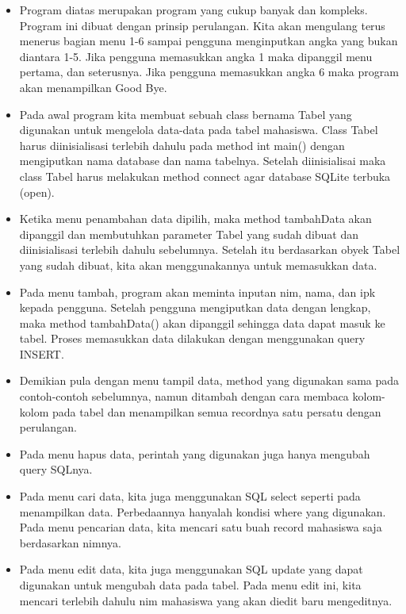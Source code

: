 \begin{itemize}
\item
Program diatas merupakan program yang cukup banyak dan kompleks.
Program ini dibuat dengan prinsip perulangan. Kita akan mengulang
terus menerus bagian menu 1-6 sampai pengguna menginputkan angka yang
bukan diantara 1-5. Jika pengguna memasukkan angka 1 maka dipanggil
menu pertama, dan seterusnya. Jika pengguna memasukkan angka 6 maka
program akan menampilkan Good Bye.
\item
Pada awal program kita membuat sebuah class bernama Tabel yang
digunakan untuk mengelola data-data pada tabel mahasiswa. Class Tabel
harus diinisialisasi terlebih dahulu pada method int main() dengan
mengiputkan nama database dan nama tabelnya. Setelah diinisialisai
maka class Tabel harus melakukan method connect agar database SQLite
terbuka (open).
\item
Ketika menu penambahan data dipilih, maka method tambahData akan
dipanggil dan membutuhkan parameter Tabel yang sudah dibuat dan
diinisialisasi terlebih dahulu sebelumnya. Setelah itu berdasarkan
obyek Tabel yang sudah dibuat, kita akan menggunakannya untuk
memasukkan data.
\item
Pada menu tambah, program akan meminta inputan nim, nama, dan ipk
kepada pengguna. Setelah pengguna mengiputkan data dengan lengkap,
maka method tambahData() akan dipanggil sehingga data dapat masuk ke
tabel. Proses memasukkan data dilakukan dengan menggunakan query
INSERT.
\item
Demikian pula dengan menu tampil data, method yang digunakan sama pada
contoh-contoh sebelumnya, namun ditambah dengan cara membaca
kolom-kolom pada tabel dan menampilkan semua recordnya satu persatu
dengan perulangan.
\item
Pada menu hapus data, perintah yang digunakan juga hanya mengubah
query SQLnya.
\item
Pada menu cari data, kita juga menggunakan SQL select seperti pada
menampilkan data. Perbedaannya hanyalah kondisi where yang digunakan.
Pada menu pencarian data, kita mencari satu buah record mahasiswa saja
berdasarkan nimnya.
\item
Pada menu edit data, kita juga menggunakan SQL update yang dapat
digunakan untuk mengubah data pada tabel. Pada menu edit ini, kita
mencari terlebih dahulu nim mahasiswa yang akan diedit baru
mengeditnya.
\end{itemize}

